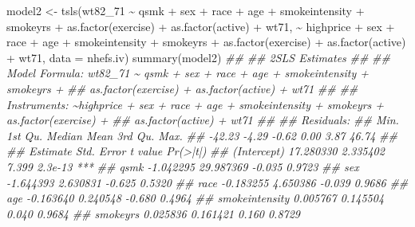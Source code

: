 \documentclass[
  10pt,
  a4paper,
]{book}
\newenvironment{Shaded}{\begin{snugshade}}{\end{snugshade}}
\newcommand{\AttributeTok}[1]{\textcolor[rgb]{0.40,0.45,0.13}{#1}}
\newcommand{\DocumentationTok}[1]{\textcolor[rgb]{0.37,0.37,0.37}{\textit{#1}}}
\newcommand{\FunctionTok}[1]{\textcolor[rgb]{0.28,0.35,0.67}{#1}}
\newcommand{\NormalTok}[1]{\textcolor[rgb]{0.00,0.46,0.62}{#1}}
\newcommand{\OtherTok}[1]{\textcolor[rgb]{0.00,0.46,0.62}{#1}}
\newcommand{\SpecialCharTok}[1]{\textcolor[rgb]{0.37,0.37,0.37}{#1}}
\begin{document}
\begin{Shaded}
\begin{Highlighting}[]
\NormalTok{model2 }\OtherTok{\textless{}{-}} \FunctionTok{tsls}\NormalTok{(wt82\_71 }\SpecialCharTok{\textasciitilde{}}\NormalTok{ qsmk }\SpecialCharTok{+}\NormalTok{ sex }\SpecialCharTok{+}\NormalTok{ race }\SpecialCharTok{+}\NormalTok{ age }\SpecialCharTok{+}\NormalTok{ smokeintensity }\SpecialCharTok{+}\NormalTok{ smokeyrs }\SpecialCharTok{+} 
                      \FunctionTok{as.factor}\NormalTok{(exercise) }\SpecialCharTok{+} \FunctionTok{as.factor}\NormalTok{(active) }\SpecialCharTok{+}\NormalTok{ wt71,}
             \SpecialCharTok{\textasciitilde{}}\NormalTok{ highprice }\SpecialCharTok{+}\NormalTok{ sex }\SpecialCharTok{+}\NormalTok{ race }\SpecialCharTok{+}\NormalTok{ age }\SpecialCharTok{+}\NormalTok{ smokeintensity }\SpecialCharTok{+}\NormalTok{ smokeyrs }\SpecialCharTok{+} \FunctionTok{as.factor}\NormalTok{(exercise) }\SpecialCharTok{+}
               \FunctionTok{as.factor}\NormalTok{(active) }\SpecialCharTok{+}\NormalTok{ wt71, }\AttributeTok{data =}\NormalTok{ nhefs.iv)}
\FunctionTok{summary}\NormalTok{(model2)}
\DocumentationTok{\#\# }
\DocumentationTok{\#\#  2SLS Estimates}
\DocumentationTok{\#\# }
\DocumentationTok{\#\# Model Formula: wt82\_71 \textasciitilde{} qsmk + sex + race + age + smokeintensity + smokeyrs + }
\DocumentationTok{\#\#     as.factor(exercise) + as.factor(active) + wt71}
\DocumentationTok{\#\# }
\DocumentationTok{\#\# Instruments: \textasciitilde{}highprice + sex + race + age + smokeintensity + smokeyrs + as.factor(exercise) + }
\DocumentationTok{\#\#     as.factor(active) + wt71}
\DocumentationTok{\#\# }
\DocumentationTok{\#\# Residuals:}
\DocumentationTok{\#\#    Min. 1st Qu.  Median    Mean 3rd Qu.    Max. }
\DocumentationTok{\#\#  {-}42.23   {-}4.29   {-}0.62    0.00    3.87   46.74 }
\DocumentationTok{\#\# }
\DocumentationTok{\#\#                       Estimate Std. Error t value Pr(\textgreater{}|t|)    }
\DocumentationTok{\#\# (Intercept)          17.280330   2.335402   7.399  2.3e{-}13 ***}
\DocumentationTok{\#\# qsmk                 {-}1.042295  29.987369  {-}0.035   0.9723    }
\DocumentationTok{\#\# sex                  {-}1.644393   2.630831  {-}0.625   0.5320    }
\DocumentationTok{\#\# race                 {-}0.183255   4.650386  {-}0.039   0.9686    }
\DocumentationTok{\#\# age                  {-}0.163640   0.240548  {-}0.680   0.4964    }
\DocumentationTok{\#\# smokeintensity        0.005767   0.145504   0.040   0.9684    }
\DocumentationTok{\#\# smokeyrs              0.025836   0.161421   0.160   0.8729    }

\end{Highlighting}
\end{Shaded}
\end{document}

